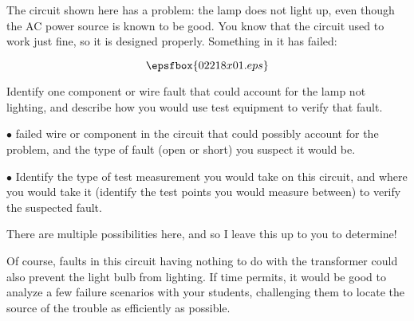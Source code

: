 

The circuit shown here has a problem: the lamp does not light up, even though the AC power source is known to be good.  You know that the circuit used to work just fine, so it is designed properly.  Something in it has failed:

$$\epsfbox{02218x01.eps}$$

Identify one component or wire fault that could account for the lamp not lighting, and describe how you would use test equipment to verify that fault.

\vskip 10pt

\medskip
\item{$\bullet$}  failed wire or component in the circuit that could possibly account for the problem, and the type of fault (open or short) you suspect it would be.
\vskip 40pt
\item{$\bullet$} Identify the type of test measurement you would take on this circuit, and where you would take it (identify the test points you would measure between) to verify the suspected fault.
\medskip







There are multiple possibilities here, and so I leave this up to you to determine!







Of course, faults in this circuit having nothing to do with the transformer could also prevent the light bulb from lighting.  If time permits, it would be good to analyze a few failure scenarios with your students, challenging them to locate the source of the trouble as efficiently as possible.




